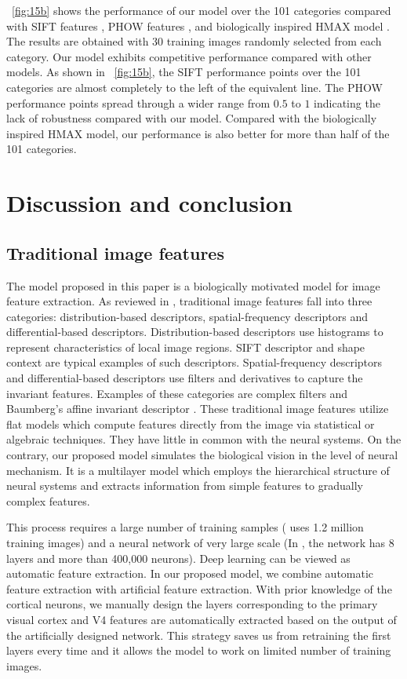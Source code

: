 \documentclass[twocolumn]{article}
\begin{document}
\figurename~\ref{fig:15b} shows the performance of our model over the 101 categories
compared with SIFT features \cite{lowe1999}, PHOW features \cite{lazebnik2006}, and biologically inspired HMAX model \cite{cadieu2007}.
The results are obtained with 30 training images randomly selected from each category.
Our model exhibits competitive performance compared with other models.
As shown in \figurename~\ref{fig:15b}, the SIFT performance points over the 101 categories are almost completely to the left of the equivalent line.
The PHOW performance points spread through a wider range from $0.5$ to $1$ indicating the lack of robustness compared with our model.
Compared with the biologically inspired HMAX model, our performance is also better for more than half of the 101 categories.

\section{Discussion and conclusion}\label{sec:5}

\subsection{Traditional image features}

The model proposed in this paper is a biologically motivated model for image feature extraction.
As reviewed in \cite{mikolajczyk2005}, traditional image features fall into three categories: 
distribution-based descriptors, spatial-frequency descriptors and differential-based descriptors.
Distribution-based descriptors use histograms to represent characteristics of local image regions.
SIFT descriptor \cite{lowe1999} and shape context \cite{belongie2002} are typical examples of such descriptors.
Spatial-frequency descriptors and differential-based descriptors use filters and derivatives to capture the invariant features. 
Examples of these categories are complex filters \cite{schaffalitzky2002} and Baumberg's affine invariant descriptor \cite{baumberg2000}.
These traditional image features utilize flat models which compute features directly from the image via statistical or algebraic techniques. 
They have little in common with the neural systems.
On the contrary, our proposed model simulates the biological vision in the level of neural mechanism.
It is a multilayer model which employs the hierarchical structure of neural systems and extracts information from simple features to gradually complex features. 

This process requires a large number of training samples (\cite{krizhevsky2012} uses 1.2 million training images)
and a neural network of very large scale (In \cite{krizhevsky2012}, the network has 8 layers and more than 400,000 neurons).
Deep learning can be viewed as automatic feature extraction.
In our proposed model, we combine automatic feature extraction with artificial feature extraction.
With prior knowledge of the cortical neurons, we manually design the layers corresponding to the primary visual cortex
and V4 features are automatically extracted based on the output of the artificially designed network.
This strategy saves us from retraining the first layers every time
and it allows the model to work on limited number of training images.
\end{document}
